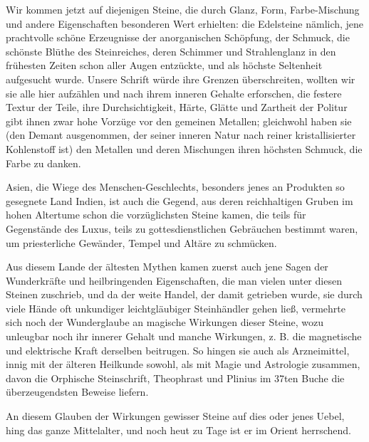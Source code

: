 \documentclass[a4paper, 11pt, oneside, polutonikogreek, german]{article}
\begin{document}
Wir kommen jetzt auf diejenigen Steine, die durch Glanz, Form, Farbe-Mischung und andere Eigenschaften besonderen Wert erhielten: die Edelsteine nämlich, jene prachtvolle schöne Erzeugnisse der anorganischen Schöpfung, der Schmuck, die schönste Blüthe des Steinreiches, deren Schimmer und Strahlenglanz in den frühesten Zeiten schon aller Augen entzückte, und als höchste Seltenheit aufgesucht wurde. Unsere Schrift würde ihre Grenzen überschreiten, wollten wir sie alle hier aufzählen und nach ihrem inneren Gehalte erforschen, die festere Textur der Teile, ihre Durchsichtigkeit, Härte, Glätte und Zartheit der Politur gibt ihnen zwar hohe Vorzüge vor den gemeinen Metallen; gleichwohl haben sie (den Demant ausgenommen, der seiner inneren Natur nach reiner kristallisierter Kohlenstoff ist) den Metallen und deren Mischungen ihren höchsten Schmuck, die Farbe zu danken.

Asien, die Wiege des Menschen-Geschlechts, besonders jenes an Produkten so gesegnete Land Indien, ist auch die Gegend, aus deren reichhaltigen Gruben im hohen Altertume schon die vorzüglichsten Steine kamen, die teils für Gegenstände des Luxus, teils zu gottesdienstlichen Gebräuchen bestimmt waren, um priesterliche Gewänder, Tempel und Altäre zu schmücken.

Aus diesem Lande der ältesten Mythen kamen zuerst auch jene Sagen der Wunderkräfte und heilbringenden Eigenschaften, die man vielen unter diesen Steinen zuschrieb, und da der weite Handel, der damit getrieben wurde, sie durch viele Hände oft unkundiger leichtgläubiger Steinhändler gehen ließ, vermehrte sich noch der Wunderglaube an magische Wirkungen dieser Steine, wozu unleugbar noch ihr innerer Gehalt und manche Wirkungen, z. B. die magnetische und elektrische Kraft derselben beitrugen. So hingen sie auch als Arzneimittel, innig mit der älteren Heilkunde sowohl, als mit Magie und Astrologie zusammen, davon die Orphische Steinschrift, Theophrast und Plinius im 37ten Buche die überzeugendsten Beweise liefern.

An diesem Glauben der Wirkungen gewisser Steine auf dies oder jenes Uebel, hing das ganze Mittelalter, und noch heut zu Tage ist er im Orient herrschend.
\end{document}
